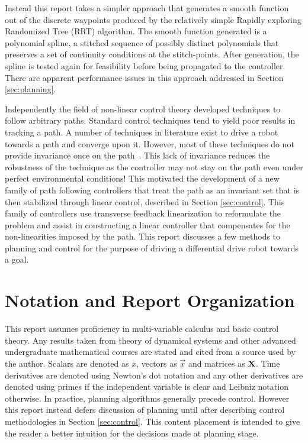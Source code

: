 Instead this report takes a simpler approach that generates a smooth function out of the discrete waypoints produced by the relatively simple Rapidly exploring Randomized Tree (RRT) algorithm. The smooth function generated is a polynomial spline, a stitched sequence of possibly distinct polynomials that preserves a set of continuity conditions at the stitch-points. After generation, the spline is tested again for feasibility before being propagated to the controller. There are apparent performance issues in this approach addressed in Section \ref{sec:planning}.

Independently the field of non-linear control theory developed techniques to follow arbitrary paths. Standard control techniques tend to yield poor results in tracking a path. A number of techniques in literature exist to drive a robot towards a path and converge upon it. However, most of these techniques do not provide invariance once on the path~\cite{Gill15}. This lack of invariance reduces the robustness of the technique as the controller may not stay on the path even under perfect environmental conditions! This motivated the development of a new family of path following controllers that treat the path as an invariant set that is then stabilized through linear control, described in Section \ref{sec:control}. This family of controllers use transverse feedback linearization to reformulate the problem and assist in constructing a linear controller that compensates for the non-linearities imposed by the path. This report discusses a few methods to planning and control for the purpose of driving a differential drive robot towards a goal.

\section{Notation and Report Organization}
This report assumes proficiency in multi-variable calculus and basic control theory. Any results taken from theory of dynamical systems and other advanced undergraduate mathematical courses are stated and cited from a source used by the author. Scalars are denoted as $x$, vectors as $\vec{x}$ and matrices as $\mathbf{X}$. Time derivatives are denoted using Newton's dot notation and any other derivatives are denoted using primes if the independent variable is clear and Leibniz notation otherwise. In practice, planning algorithms generally precede control. However this report instead defers discussion of planning until after describing control methodologies in Section \ref{sec:control}. This content placement is intended to give the reader a better intuition for the decisions made at planning stage.

